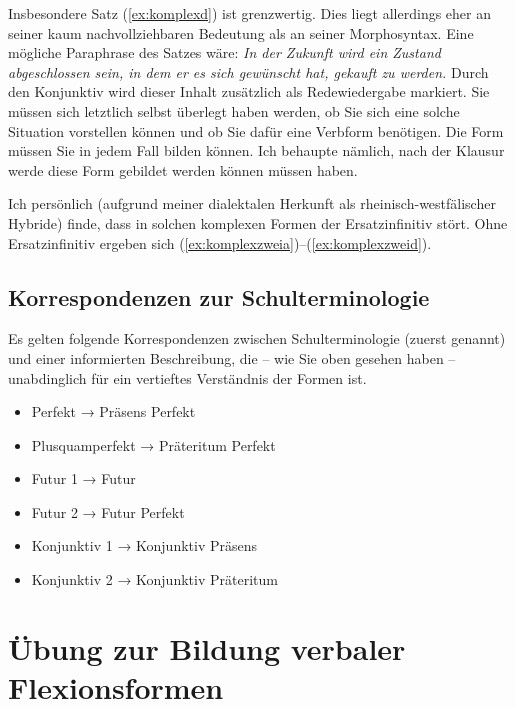 Insbesondere Satz (\ref{ex:komplexd}) ist grenzwertig.
Dies liegt allerdings eher an seiner kaum nachvollziehbaren Bedeutung als an seiner Morphosyntax.
Eine mögliche Paraphrase des Satzes wäre:
\textit{In der Zukunft wird ein Zustand abgeschlossen sein, in dem er es sich gewünscht hat, gekauft zu werden.}
Durch den Konjunktiv wird dieser Inhalt zusätzlich als Redewiedergabe markiert.
Sie müssen sich letztlich selbst überlegt haben werden, ob Sie sich eine solche Situation vorstellen können und ob Sie dafür eine Verbform benötigen.
Die Form müssen Sie in jedem Fall bilden können.
Ich behaupte nämlich, nach der Klausur werde diese Form gebildet werden können müssen haben.

Ich persönlich (aufgrund meiner dialektalen Herkunft als rheinisch-westfälischer Hybride) finde, dass in solchen komplexen Formen der Ersatzinfinitiv stört.
Ohne Ersatzinfinitiv ergeben sich (\ref{ex:komplexzweia})--(\ref{ex:komplexzweid}).

\begin{exe}
\end{exe}

\subsection{Korrespondenzen zur Schulterminologie}

Es gelten folgende Korrespondenzen zwischen Schulterminologie (zuerst genannt) und einer informierten Beschreibung, die -- wie Sie oben gesehen haben -- unabdinglich für ein vertieftes Verständnis der Formen ist.

\begin{itemize}\Lf
  \item Perfekt → Präsens Perfekt
  \item Plusquamperfekt → Präteritum Perfekt
  \item Futur 1 → Futur
  \item Futur 2 → Futur Perfekt
  \item Konjunktiv 1 → Konjunktiv Präsens
  \item Konjunktiv 2 → Konjunktiv Präteritum
\end{itemize}

\section{Übung zur Bildung verbaler Flexionsformen}


